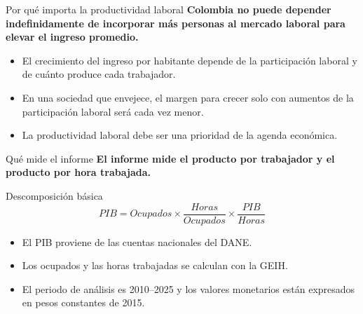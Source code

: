 \documentclass[aspectratio=169,11pt]{beamer}
\newcommand{\idea}[1]{\textbf{\color{cjcblue}#1}}
\begin{document}
\begin{frame}{Por qué importa la productividad laboral}
  \idea{Colombia no puede depender indefinidamente de incorporar más personas al mercado laboral para elevar el ingreso promedio.}

  \vspace{0.4cm}
  \begin{itemize}
    \item El crecimiento del ingreso por habitante depende de la participación laboral y de cuánto produce cada trabajador.
    \item En una sociedad que envejece, el margen para crecer solo con aumentos de la participación laboral será cada vez menor.
    \item La productividad laboral debe ser una prioridad de la agenda económica.
  \end{itemize}
\end{frame}

\begin{frame}{Qué mide el informe}
  \idea{El informe mide el producto por trabajador y el producto por hora trabajada.}

  \vspace{0.45cm}
  \begin{block}{Descomposición básica}
    \[
      PIB = Ocupados \times \frac{Horas}{Ocupados} \times \frac{PIB}{Horas}
    \]
  \end{block}

  \vspace{0.25cm}
  \begin{itemize}
    \item El PIB proviene de las cuentas nacionales del DANE.
    \item Los ocupados y las horas trabajadas se calculan con la GEIH.
    \item El periodo de análisis es 2010--2025 y los valores monetarios están expresados en pesos constantes de 2015.
  \end{itemize}
\end{frame}
\end{document}
